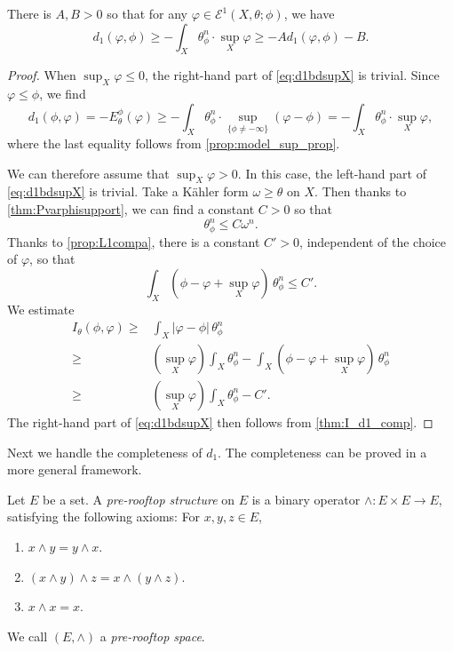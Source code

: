 \begin{lemma}\label{lma:d1bdsupX}
    There is $A,B>0$ so that for any $\varphi\in \mathcal{E}^1(X,\theta;\phi)$,  we have
    \begin{equation}\label{eq:d1bdsupX}
    d_1(\varphi,\phi)\geq -\int_X \theta_{\phi}^n\cdot \sup_X \varphi\geq -Ad_1(\varphi,\phi)-B.
    \end{equation}
\end{lemma}
\begin{proof}
    When $\sup_X \varphi\leq 0$, the right-hand part of \eqref{eq:d1bdsupX} is trivial. Since $\varphi\leq \phi$, we find
    \[
    d_1(\phi,\varphi)=-E_{\theta}^{\phi}(\varphi)\geq -\int_X \theta_{\phi}^n\cdot\sup_{\{\phi\neq -\infty\}} (\varphi-\phi)=-\int_X \theta_{\phi}^n\cdot\sup_X \varphi,
    \]
    where the last equality follows from \cref{prop:model_sup_prop}.

    We can therefore assume that $\sup_X \varphi> 0$. In this case, the left-hand part of \eqref{eq:d1bdsupX} is trivial. Take a Kähler form $\omega\geq \theta$ on $X$. Then thanks to \cref{thm:Pvarphisupport}, we can find a constant $C>0$ so that
    \[
    \theta_{\phi}^n\leq C\omega^n.
    \]
    Thanks to \cref{prop:L1compa}, there is a constant $C'>0$, independent of the choice of $\varphi$, so that
    \[
    \int_X \left( \phi-\varphi+\sup_X \varphi \right)\,\theta_{\phi}^n\leq C'.
    \]
    We estimate
    \[
    \begin{aligned}
    I_{\theta}(\phi,\varphi)\geq & \int_X |\varphi-\phi|\,\theta_{\phi}^n\\
    \geq & \left(\sup_X \varphi\right)\int_X \theta_{\phi}^n-\int_X \left( \phi-\varphi+\sup_X \varphi \right)\,\theta_{\phi}^n \\
    \geq & \left(\sup_X \varphi\right)\int_X \theta_{\phi}^n-C'.
    \end{aligned}
    \]
    The right-hand part of \eqref{eq:d1bdsupX} then follows from \cref{thm:I_d1_comp}.
\end{proof}

Next we handle the completeness of $d_1$. The completeness can be proved in a more general framework.
\begin{definition}\label{def:rays:L858}
	Let $E$ be a set. A \emph{pre-rooftop structure} on $E$ is a binary operator $\land:E\times E\rightarrow E$, satisfying the following axioms: For $x,y,z\in E$,
	\begin{enumerate}
		\item\label{itm:chapter-rays:L841:1} $x\land y=y\land x$.
		\item\label{itm:chapter-rays:L841:2} $(x\land y)\land z=x\land (y\land z)$.
		\item\label{itm:chapter-rays:L841:3} $x\land x=x$.
	\end{enumerate}
	We call $(E,\land)$ a \emph{pre-rooftop space}.
\end{definition}

